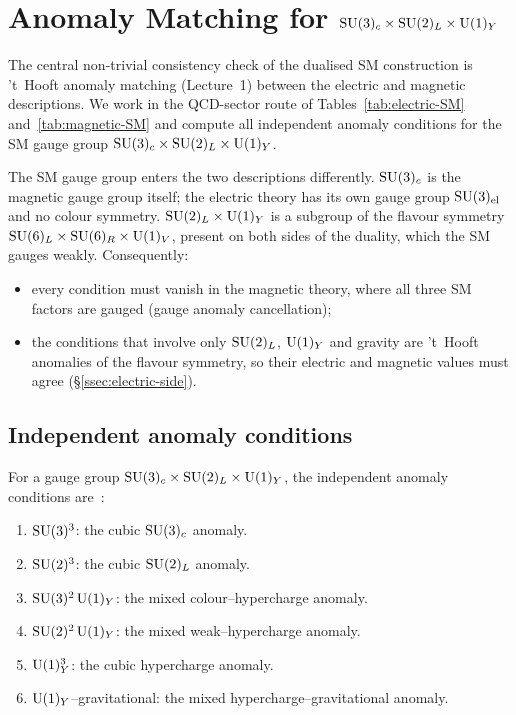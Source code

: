 \documentclass[11pt,a4paper]{article}
\begin{document}
\section{Anomaly Matching for $\mathrm{SU}(3)_c \times \mathrm{SU}(2)_L \times \mathrm{U}(1)_Y$}
\label{sec:anomaly-matching}

The central non-trivial consistency check of the dualised SM
construction is 't~Hooft anomaly matching (Lecture~1) between the
electric and magnetic descriptions.  We work in the QCD-sector route of
Tables~\ref{tab:electric-SM} and~\ref{tab:magnetic-SM} and compute all
independent anomaly conditions for the SM gauge group
$\mathrm{SU}(3)_c \times \mathrm{SU}(2)_L \times \mathrm{U}(1)_Y$.

\begin{remark}
  The SM gauge group enters the two descriptions differently.
  $\mathrm{SU}(3)_c$ is the magnetic gauge group itself; the electric theory has
  its own gauge group $\mathrm{SU}(3)_{\mathrm{el}}$ and no colour symmetry.
  $\mathrm{SU}(2)_L \times \mathrm{U}(1)_Y$ is a subgroup of the flavour symmetry
  $\mathrm{SU}(6)_L \times \mathrm{SU}(6)_R \times \mathrm{U}(1)_V$, present on both sides of
  the duality, which the SM gauges weakly.  Consequently:
  \begin{itemize}
    \item every condition must vanish in the magnetic theory, where all
      three SM factors are gauged (gauge anomaly cancellation);
    \item the conditions that involve only $\mathrm{SU}(2)_L$, $\mathrm{U}(1)_Y$ and
      gravity are 't~Hooft anomalies of the flavour symmetry, so their
      electric and magnetic values must agree
      (\S\ref{ssec:electric-side}).
  \end{itemize}
\end{remark}

\subsection{Independent anomaly conditions}

For a gauge group $\mathrm{SU}(3)_c \times \mathrm{SU}(2)_L \times \mathrm{U}(1)_Y$, the
independent anomaly conditions are~\cite{tHooft1980}:

\begin{enumerate}[label=(\roman*)]
  \item $\mathrm{SU}(3)^3$: the cubic $\mathrm{SU}(3)_c$ anomaly.
  \item $\mathrm{SU}(2)^3$: the cubic $\mathrm{SU}(2)_L$ anomaly.
  \item $\mathrm{SU}(3)^2\,\mathrm{U}(1)_Y$: the mixed colour--hypercharge anomaly.
  \item $\mathrm{SU}(2)^2\,\mathrm{U}(1)_Y$: the mixed weak--hypercharge anomaly.
  \item $\mathrm{U}(1)_Y^3$: the cubic hypercharge anomaly.
  \item $\mathrm{U}(1)_Y$--gravitational: the mixed hypercharge--gravitational
    anomaly.
\end{enumerate}
\end{document}
